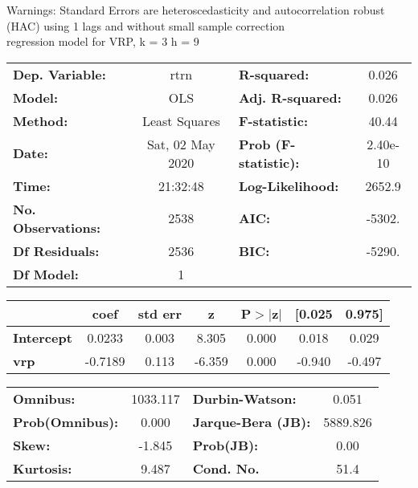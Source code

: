 Warnings: \newline
 [1] Standard Errors are heteroscedasticity and autocorrelation robust (HAC) using 1 lags and without small sample correction\\ 

regression model for VRP, k = 3 h = 9\begin{center}
\begin{tabular}{lclc}
\toprule
\textbf{Dep. Variable:}    &       rtrn       & \textbf{  R-squared:         } &     0.026   \\
\textbf{Model:}            &       OLS        & \textbf{  Adj. R-squared:    } &     0.026   \\
\textbf{Method:}           &  Least Squares   & \textbf{  F-statistic:       } &     40.44   \\
\textbf{Date:}             & Sat, 02 May 2020 & \textbf{  Prob (F-statistic):} &  2.40e-10   \\
\textbf{Time:}             &     21:32:48     & \textbf{  Log-Likelihood:    } &    2652.9   \\
\textbf{No. Observations:} &        2538      & \textbf{  AIC:               } &    -5302.   \\
\textbf{Df Residuals:}     &        2536      & \textbf{  BIC:               } &    -5290.   \\
\textbf{Df Model:}         &           1      & \textbf{                     } &             \\
\bottomrule
\end{tabular}
\begin{tabular}{lcccccc}
                   & \textbf{coef} & \textbf{std err} & \textbf{z} & \textbf{P$> |$z$|$} & \textbf{[0.025} & \textbf{0.975]}  \\
\midrule
\textbf{Intercept} &       0.0233  &        0.003     &     8.305  &         0.000        &        0.018    &        0.029     \\
\textbf{vrp}       &      -0.7189  &        0.113     &    -6.359  &         0.000        &       -0.940    &       -0.497     \\
\bottomrule
\end{tabular}
\begin{tabular}{lclc}
\textbf{Omnibus:}       & 1033.117 & \textbf{  Durbin-Watson:     } &    0.051  \\
\textbf{Prob(Omnibus):} &   0.000  & \textbf{  Jarque-Bera (JB):  } & 5889.826  \\
\textbf{Skew:}          &  -1.845  & \textbf{  Prob(JB):          } &     0.00  \\
\textbf{Kurtosis:}      &   9.487  & \textbf{  Cond. No.          } &     51.4  \\
\bottomrule
\end{tabular}
\end{center}

